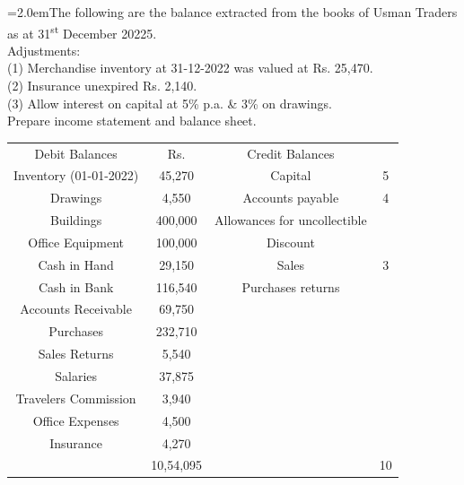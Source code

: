 \documentclass[11pt,a4paper]{article}
\newcommand{\lqn}[2]{\Needspace{6\baselineskip}\par\medskip\noindent\hangindent=2.0em\hangafter=1\makebox[2.0em][l]{\textbf{#1.}}#2\par}
\begin{document}
\lqn{118}{The following are the balance extracted from the books of Usman Traders as at 31\textsuperscript{st} December 20225.\\
Adjustments:\\
(1) Merchandise inventory at 31-12-2022 was valued at Rs. 25,470.\\
(2) Insurance unexpired Rs. 2,140.\\
(3) Allow interest on capital at 5\% p.a. \& 3\% on drawings.\\
Prepare income statement and balance sheet.\par
\par\smallskip\noindent\hspace*{1.2em}\begin{tabular}{|cccc|}
\hline
Debit Balances & Rs. & Credit Balances &  \\
Inventory (01-01-2022) & 45,270 & Capital & 5 \\
Drawings & 4,550 & Accounts payable & 4 \\
Buildings & 400,000 & Allowances for uncollectible &  \\
Office Equipment & 100,000 & Discount &  \\
Cash in Hand & 29,150 & Sales & 3 \\
Cash in Bank & 116,540 & Purchases returns &  \\
Accounts Receivable & 69,750 &  &  \\
Purchases & 232,710 &  &  \\
Sales Returns & 5,540 &  &  \\
Salaries & 37,875 &  &  \\
Travelers Commission & 3,940 &  &  \\
Office Expenses & 4,500 &  &  \\
Insurance & 4,270 &  &  \\
 & 10,54,095 &  & 10 \\
\hline
\end{tabular}\par\smallskip
}
\end{document}
